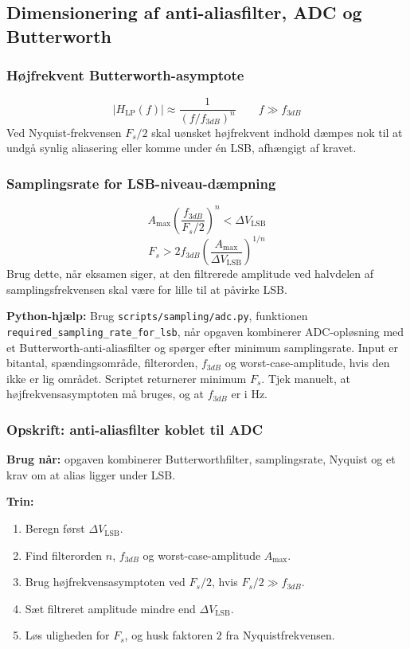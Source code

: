 \subsection{Dimensionering af anti-aliasfilter, ADC og Butterworth}

\subsubsection{Højfrekvent Butterworth-asymptote}
\[
|H_{\mathrm{LP}}(f)|\approx \frac{1}{(f/f_{3dB})^n}\qquad f\gg f_{3dB}
\]
Ved Nyquist-frekvensen \(F_s/2\) skal uønsket højfrekvent indhold dæmpes nok til at undgå synlig aliasering eller komme under én LSB, afhængigt af kravet.

\subsubsection{Samplingsrate for LSB-niveau-dæmpning}
\[
A_{\max}\left(\frac{f_{3dB}}{F_s/2}\right)^n<\Delta V_{\mathrm{LSB}}
\]
\[
F_s>2f_{3dB}\left(\frac{A_{\max}}{\Delta V_{\mathrm{LSB}}}\right)^{1/n}
\]
Brug dette, når eksamen siger, at den filtrerede amplitude ved halvdelen af samplingsfrekvensen skal være for lille til at påvirke LSB.

\textbf{Python-hjælp:} Brug \texttt{scripts/sampling/adc.py}, funktionen \texttt{required\_sampling\_rate\_for\_lsb}, når opgaven kombinerer ADC-opløsning med et Butterworth-anti-aliasfilter og spørger efter minimum samplingsrate. Input er bitantal, spændingsområde, filterorden, \(f_{3dB}\) og worst-case-amplitude, hvis den ikke er lig området. Scriptet returnerer minimum \(F_s\). Tjek manuelt, at højfrekvensasymptoten må bruges, og at \(f_{3dB}\) er i Hz.

\subsubsection{Opskrift: anti-aliasfilter koblet til ADC}
\textbf{Brug når:} opgaven kombinerer Butterworthfilter, samplingsrate, Nyquist og et krav om at alias ligger under LSB.

\textbf{Trin:}
\begin{enumerate}
    \item Beregn først \(\Delta V_{\mathrm{LSB}}\).
    \item Find filterorden \(n\), \(f_{3dB}\) og worst-case-amplitude \(A_{\max}\).
    \item Brug højfrekvensasymptoten ved \(F_s/2\), hvis \(F_s/2\gg f_{3dB}\).
    \item Sæt filtreret amplitude mindre end \(\Delta V_{\mathrm{LSB}}\).
    \item Løs uligheden for \(F_s\), og husk faktoren \(2\) fra Nyquistfrekvensen.
\end{enumerate}

